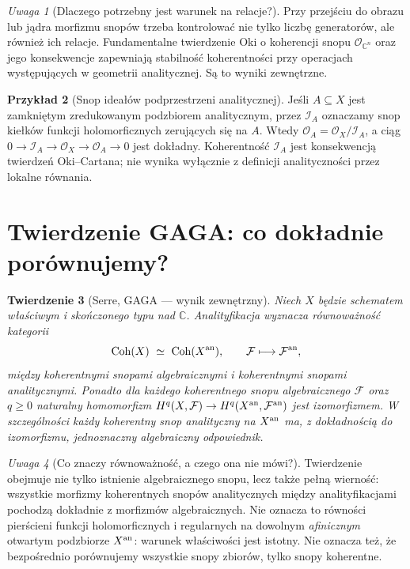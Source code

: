 \documentclass[11pt,a4paper,openany]{report}
\numberwithin{equation}{section}
\theoremstyle{plain}
\newtheorem{twierdzenie}{Twierdzenie}[section]
\theoremstyle{definition}
\newtheorem{przyklad}[twierdzenie]{Przykład}
\theoremstyle{remark}
\newtheorem{uwaga}[twierdzenie]{Uwaga}
\newcommand{\C}{\mathbb C}
\begin{document}
\begin{uwaga}[Dlaczego potrzebny jest warunek na relacje?]
Przy przejściu do obrazu lub jądra morfizmu snopów trzeba
kontrolować nie tylko liczbę generatorów, ale również ich
relacje. Fundamentalne twierdzenie Oki o koherencji snopu
$\mathcal O_{\C^n}$ oraz jego konsekwencje zapewniają
stabilność koherentności przy operacjach występujących
w geometrii analitycznej. Są to wyniki zewnętrzne.
\end{uwaga}

\begin{przyklad}[Snop ideałów podprzestrzeni analitycznej]
Jeśli $A\subseteq X$ jest zamkniętym zredukowanym
podzbiorem analitycznym, przez $\mathcal I_A$ oznaczamy
snop kiełków funkcji holomorficznych zerujących się na $A$.
Wtedy $\mathcal O_A=\mathcal O_X/\mathcal I_A$,
a ciąg
$0\to\mathcal I_A\to\mathcal O_X\to\mathcal O_A\to0$
jest dokładny. Koherentność $\mathcal I_A$ jest
konsekwencją twierdzeń Oki--Cartana; nie wynika wyłącznie
z definicji analityczności przez lokalne równania.
\end{przyklad}

\section{Twierdzenie GAGA: co dokładnie porównujemy?}
\label{sec:ga9-gaga}

\begin{twierdzenie}[Serre, GAGA — wynik zewnętrzny]
\label{tw:ga9-gaga}
Niech $X$ będzie schematem właściwym i skończonego typu nad $\C$.
Analityfikacja wyznacza równoważność kategorii
\[
 \operatorname{Coh}(X)\ \simeq\ \operatorname{Coh}(X^{\rm an}),
 \qquad \mathcal F\longmapsto\mathcal F^{\rm an},
\]
między koherentnymi snopami algebraicznymi i koherentnymi
snopami analitycznymi. Ponadto dla każdego koherentnego
snopu algebraicznego $\mathcal F$ oraz $q\ge0$ naturalny
homomorfizm
$H^q(X,\mathcal F)\to H^q(X^{\rm an},\mathcal F^{\rm an})$
jest izomorfizmem. W szczególności każdy koherentny
snop analityczny na $X^{\rm an}$ ma, z dokładnością do
izomorfizmu, jednoznaczny algebraiczny odpowiednik.
\end{twierdzenie}

\begin{uwaga}[Co znaczy równoważność, a czego ona nie mówi?]
Twierdzenie obejmuje nie tylko istnienie algebraicznego
snopu, lecz także pełną wierność: wszystkie morfizmy
koherentnych snopów analitycznych między analityfikacjami
pochodzą dokładnie z morfizmów algebraicznych.
Nie oznacza to równości pierścieni funkcji holomorficznych
i regularnych na dowolnym \emph{afinicznym} otwartym
podzbiorze $X^{\rm an}$: warunek właściwości jest
istotny. Nie oznacza też, że bezpośrednio porównujemy
wszystkie snopy zbiorów, tylko snopy koherentne.
\end{uwaga}
\end{document}
